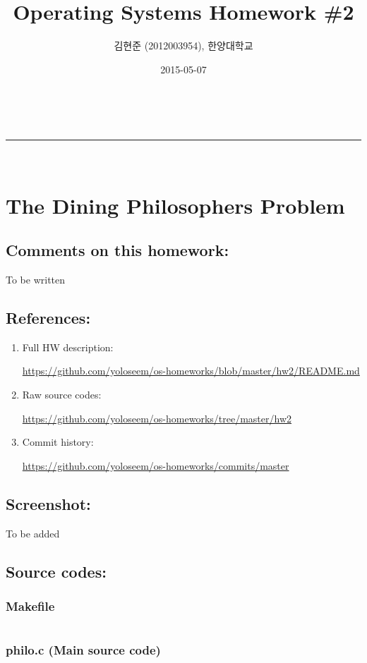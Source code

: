 \documentclass[a4paper,11pt]{article}
\makeatletter
\newcommand{\linia}{\rule{\linewidth}{0.5pt}}
\renewcommand{\maketitle}{
\begin{center}
\vspace{2ex}
{\huge \textsc{\@title}}
\vspace{1ex}
\\
\linia\\
\@author \hfill \@date
\vspace{4ex}
\end{center}
}
\makeatother
\begin{document}
\title{Operating Systems Homework \#2}

\author{김현준 (2012003954), 한양대학교}

\date{2015-05-07}

\maketitle

\section*{The Dining Philosophers Problem}

\subsection*{Comments on this homework:}
    To be written

\subsection*{References:}
\begin{enumerate}
\item
    Full HW description:

        \url{https://github.com/yoloseem/os-homeworks/blob/master/hw2/README.md}

\item
    Raw source codes:

        \url{https://github.com/yoloseem/os-homeworks/tree/master/hw2}

\item
    Commit history:

        \url{https://github.com/yoloseem/os-homeworks/commits/master}
\end{enumerate}

\subsection*{Screenshot:}
    To be added

\subsection*{Source codes:}

\subsubsection*{Makefile}
\inputminted[fontsize=\footnotesize,linenos]{basemake}{Makefile}

\subsubsection*{philo.c (Main source code)}
\inputminted[fontsize=\footnotesize,linenos]{c}{philo.c}
\end{document}
